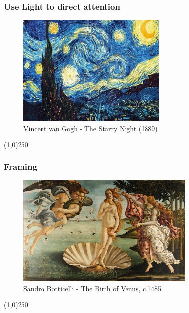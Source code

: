 \begin{frame}
\frametitle{Use Light to direct attention}
\begin{figure}
	\centering
		\includegraphics[height=5.5cm]{img/candc/starry-night-VanGogh.jpg}
	\caption{Vincent van Gogh - The Starry Night (1889)}
	\label{fig:starrynight}
\end{figure}
\end{frame}
\begin{center}\line(1,0){250}\end{center}




\begin{frame}
\frametitle{Framing}
\begin{figure}
	\centering
	\includegraphics[height=5.5cm]{img/CandC/1280px-Sandro_Botticelli_-_La_nascita_di_Venere_-_Google_Art_Project_-_edited}
	\caption[Sandro Botticelli - The Birth of Venus, c.1485]{Sandro Botticelli - The Birth of Venus, c.1485}
	\label{fig:sandrobotticelliVenus}
\end{figure}
\end{frame}
\begin{center}\line(1,0){250}\end{center}


